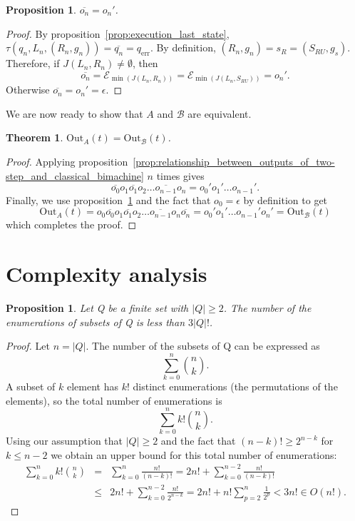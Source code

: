\documentclass{article}
\newtheorem{proposition}[definition]{Proposition}
\newtheorem{theorem}[definition]{Theorem}
\newcommand{\len}[1]{\ensuremath{\left| #1 \right|}}
\begin{document}
	\begin{proposition} \label{prop:relationship_between_outputs_last_step_of_two-step_and_classical_bimachine}
		\( \overline{o_n} = o_n' \).
	\end{proposition}
	\begin{proof}
		By proposition~\ref{prop:execution_last_state}, $\tau(q_n, L_n, (R_n, g_n)) = \overline{q_n} = q_\mathrm{err}$.
		By definition, $(R_n, g_n) = s_R = (S_{RU}, g_s)$.
		Therefore, if $J(L_n, R_n)\ne \emptyset$, then
		\[ \overline{o_n} = \mathcal{E}_{\min(J(L_n, R_n))} = \mathcal{E}_{\min(J(L_n, S_{RU}))} = o_n'. \]
		Otherwise \( \overline{o_n} = o_n' = \epsilon \).
	\end{proof}
	We are now ready to show that $A$ and $\mathcal{B}$ are equivalent.
	\begin{theorem} \label{thm:two_step_bimachines_and_classical_bimachines_equvalence}
		\( \mathrm{Out}_A(t) = \mathrm{Out}_\mathcal{B}(t) \).
	\end{theorem}
	\begin{proof}
		Applying proposition~\ref{prop:relationship_between_outputs_of_two-step_and_classical_bimachine} $n$ times gives
		\[ \overline{o_0}o_1\overline{o_1}o_2\ldots \overline{o_{n-1}}o_n = o_0'o_1'\ldots o_{n-1}'. \]
		Finally, we use proposition~\ref{prop:relationship_between_outputs_last_step_of_two-step_and_classical_bimachine} and the fact that $o_0 = \epsilon$ by definition to get
		\[ \mathrm{Out}_A(t) = o_0\overline{o_0}o_1\overline{o_1}o_2\ldots \overline{o_{n-1}}o_n\overline{o_n} = o_0'o_1'\ldots o_{n-1}'o_n' = \mathrm{Out}_\mathcal{B}(t) \]
		which completes the proof.
	\end{proof}

	\section{Complexity analysis} \label{section:complexity}
	\begin{proposition} \label{prop:enum_subsets_count}
		Let Q be a finite set with $\len{Q}\ge 2$. The number of the enumerations of subsets of Q is less than $3\len{Q}!$.
	\end{proposition}
	\begin{proof}
		Let $n = \len{Q}$.
		The number of the subsets of Q can be expressed as
		\[ \sum_{k=0}^{n} \binom{n}{k}. \]
		A subset of $k$ element has $k!$ distinct enumerations (the permutations of the elements), so the total number of enumerations is
		\[ \sum_{k=0}^{n} k!\binom{n}{k}. \]
		Using our assumption that $\len{Q}\ge 2$ and the fact that $(n-k)!\ge 2^{n-k}$ for $k\le n-2$ we obtain an upper bound for this total number of enumerations:
		\begin{eqnarray*}
			\sum_{k=0}^{n} k!\binom{n}{k} &=& \sum_{k=0}^{n} \frac{n!}{(n-k)!} = 2n! + \sum_{k=0}^{n-2} \frac{n!}{(n-k)!} \\
				&\le& 2n! + \sum_{k=0}^{n-2} \frac{n!}{2^{n-k}} = 2n! + n!\sum_{p=2}^{n} \frac{1}{2^p} < 3n!\in O(n!).
		\end{eqnarray*}
	\end{proof}
\end{document}
